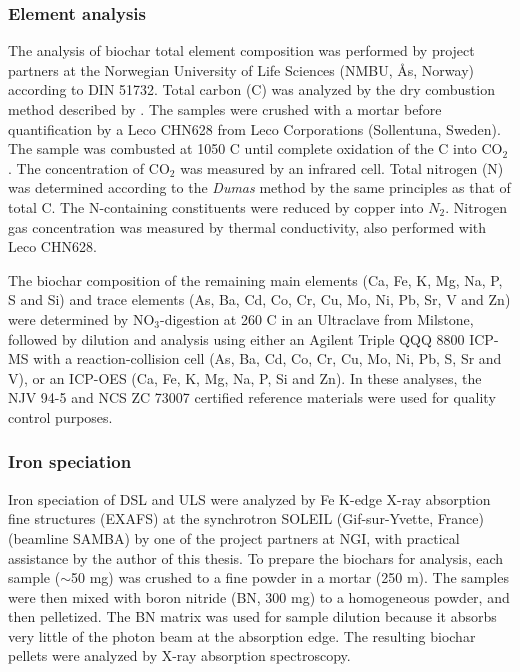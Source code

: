 \subsubsection{Element analysis}
The analysis of biochar total element composition was performed by project partners at the Norwegian University of Life Sciences (NMBU, Ås, Norway) according to DIN 51732. Total carbon (C) was analyzed by the dry combustion method described by \cite{nelson1983total}. The samples were crushed with a mortar before quantification by a Leco CHN628 from Leco Corporations (Sollentuna, Sweden). The sample was combusted at 1050 \textdegree C until complete oxidation of the C into $\mathrm{CO_2}$. The concentration of $\mathrm{CO_2}$ was measured by an infrared cell. Total nitrogen (N) was determined according to the \textit{Dumas} method \citep{Dumas1983total} by the same principles as that of total C. The N-containing constituents were reduced by copper into $N_2$. Nitrogen gas concentration was measured by thermal conductivity, also performed with Leco CHN628. 

The biochar composition of the remaining main elements (Ca, Fe, K, Mg, Na, P, S and Si) and trace elements (As, Ba, Cd, Co, Cr, Cu, Mo, Ni, Pb, Sr, V and Zn) were determined by $\mathrm{NO_3}$-digestion at 260 \textdegree C in an Ultraclave from Milstone, followed by dilution and analysis using either an Agilent Triple QQQ 8800 ICP-MS with a reaction-collision cell (As, Ba, Cd, Co, Cr, Cu, Mo, Ni, Pb, S, Sr and V), or an ICP-OES (Ca, Fe, K, Mg, Na, P, Si and Zn). In these analyses, the NJV 94-5 and NCS ZC 73007 certified reference materials were used for quality control purposes.

\subsubsection{Iron speciation}
Iron speciation of DSL and ULS were analyzed by Fe K-edge X-ray absorption fine structures (EXAFS) at the synchrotron SOLEIL (Gif-sur-Yvette, France) (beamline SAMBA) by one of the project partners at NGI, with practical assistance by the author of this thesis. To prepare the biochars for analysis, each sample ($\sim$50 mg) was crushed to a fine powder in a mortar (250 \textmu m). The samples were then mixed with boron nitride (BN, 300 mg) to a homogeneous powder, and then pelletized. The BN matrix was used for sample dilution because it absorbs very little of the photon beam at the absorption edge. The resulting biochar pellets were analyzed by X-ray absorption spectroscopy.

